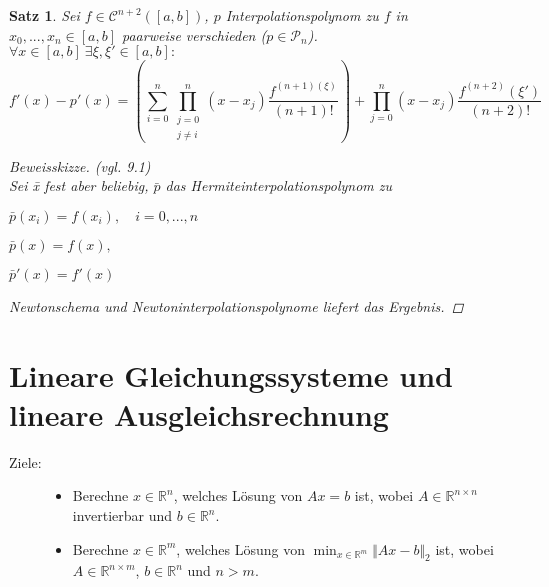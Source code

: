 \documentclass[12pt]{article}
\theoremstyle{break}
\newtheorem{theorem}{Satz}[subsection]
\begin{document}
\begin{theorem}
Sei $f \in \mathcal{C}^{n+2}([a,b])$, $p$ Interpolationspolynom zu $f$ in $x_0,..., x_n \in [a,b]$ paarweise verschieden ($p\in \mathcal{P}_n$). \\
$\forall x \in [a,b] \medspace \exists \xi, \xi' \in [a,b]:$ 
$$f'(x) - p'(x) = \left( \sum_{i=0}^n \prod_{\substack{j=0\\j \neq i}}^n (x-x_j) \frac{f^{(n+1)(\xi)}}{(n+1)!}\right) + \prod_{j=0}^n (x-x_j) \frac{f^{(n+2)}(\xi')}{(n+2)!}$$
\begin{proof}[Beweisskizze] (vgl. 9.1) \\
Sei \={x} fest aber beliebig, $\bar{p}$ das Hermiteinterpolationspolynom zu 
\begin{description}
  \item $\bar{p}(x_i) = f(x_i), \quad i=0,...,n$
  \item $\bar{p}(x) = f(x),$
  \item $\bar{p}'(x) = f'(x)$
\end{description}
Newtonschema und Newtoninterpolationspolynome liefert das Ergebnis.
\end{proof}
\end{theorem}

\section{Lineare Gleichungssysteme und lineare Ausgleichsrechnung}
%
\begin{description}
  \item[Ziele:]
    \begin{itemize}
      \item Berechne $x \in \mathbb{R}^n$, welches Lösung von $Ax = b$ ist, wobei $A \in \mathbb{R}^{n\times n}$ invertierbar und $b \in \mathbb{R}^n$.
      \item Berechne $x \in \mathbb{R}^m$, welches Lösung von $\min_{x\in \mathbb{R}^m} \Vert Ax - b \Vert _2$ ist, wobei $A \in \mathbb{R}^{n\times m}$, $b \in \mathbb{R}^n$ und $n>m$.
    \end{itemize}
\end{description}
\end{document}
